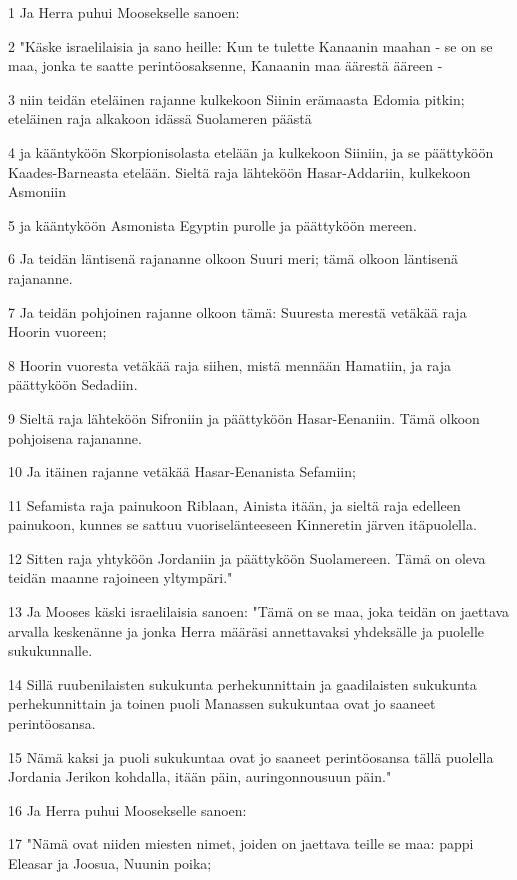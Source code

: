 \par 1 Ja Herra puhui Moosekselle sanoen:
\par 2 "Käske israelilaisia ja sano heille: Kun te tulette Kanaanin maahan - se on se maa, jonka te saatte perintöosaksenne, Kanaanin maa äärestä ääreen -
\par 3 niin teidän eteläinen rajanne kulkekoon Siinin erämaasta Edomia pitkin; eteläinen raja alkakoon idässä Suolameren päästä
\par 4 ja kääntyköön Skorpionisolasta etelään ja kulkekoon Siiniin, ja se päättyköön Kaades-Barneasta etelään. Sieltä raja lähteköön Hasar-Addariin, kulkekoon Asmoniin
\par 5 ja kääntyköön Asmonista Egyptin purolle ja päättyköön mereen.
\par 6 Ja teidän läntisenä rajananne olkoon Suuri meri; tämä olkoon läntisenä rajananne.
\par 7 Ja teidän pohjoinen rajanne olkoon tämä: Suuresta merestä vetäkää raja Hoorin vuoreen;
\par 8 Hoorin vuoresta vetäkää raja siihen, mistä mennään Hamatiin, ja raja päättyköön Sedadiin.
\par 9 Sieltä raja lähteköön Sifroniin ja päättyköön Hasar-Eenaniin. Tämä olkoon pohjoisena rajananne.
\par 10 Ja itäinen rajanne vetäkää Hasar-Eenanista Sefamiin;
\par 11 Sefamista raja painukoon Riblaan, Ainista itään, ja sieltä raja edelleen painukoon, kunnes se sattuu vuoriselänteeseen Kinneretin järven itäpuolella.
\par 12 Sitten raja yhtyköön Jordaniin ja päättyköön Suolamereen. Tämä on oleva teidän maanne rajoineen yltympäri."
\par 13 Ja Mooses käski israelilaisia sanoen: "Tämä on se maa, joka teidän on jaettava arvalla keskenänne ja jonka Herra määräsi annettavaksi yhdeksälle ja puolelle sukukunnalle.
\par 14 Sillä ruubenilaisten sukukunta perhekunnittain ja gaadilaisten sukukunta perhekunnittain ja toinen puoli Manassen sukukuntaa ovat jo saaneet perintöosansa.
\par 15 Nämä kaksi ja puoli sukukuntaa ovat jo saaneet perintöosansa tällä puolella Jordania Jerikon kohdalla, itään päin, auringonnousuun päin."
\par 16 Ja Herra puhui Moosekselle sanoen:
\par 17 "Nämä ovat niiden miesten nimet, joiden on jaettava teille se maa: pappi Eleasar ja Joosua, Nuunin poika;
